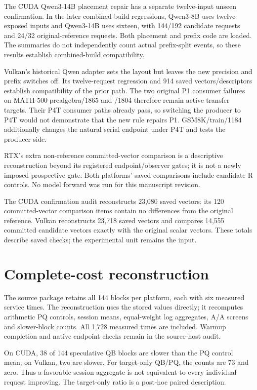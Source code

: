 The CUDA Qwen3-14B placement repair has a separate twelve-input unseen confirmation. In the later combined-build regressions, Qwen3-8B uses twelve exposed inputs and Qwen3-14B uses sixteen, with 144/192 candidate requests and 24/32 original-reference requests. Both placement and prefix code are loaded. The summaries do not independently count actual prefix-split events, so these results establish combined-build compatibility.

Vulkan's historical Qwen adapter sets the layout but leaves the new precision and prefix switches off. Its twelve-request regression and 914 saved vectors/descriptors establish compatibility of the prior path. The two original P1 consumer failures on MATH-500 prealgebra/1865 and /1804 therefore remain active transfer targets. Their P4T consumer paths already pass, so switching the producer to P4T would not demonstrate that the new rule repairs P1. GSM8K/train/1184 additionally changes the natural serial endpoint under P4T and tests the producer side.

RTX's extra non-reference committed-vector comparison is a descriptive reconstruction beyond its registered endpoint/observer gates; it is not a newly imposed prospective gate. Both platforms' saved comparisons include candidate-R controls. No model forward was run for this manuscript revision.

The CUDA confirmation audit reconstructs 23,080 saved vectors; its 120 committed-vector comparison items contain no differences from the original reference. Vulkan reconstructs 23,718 saved vectors and compares 14,555 committed candidate vectors exactly with the original scalar vectors. These totals describe saved checks; the experimental unit remains the input.

\section{Complete-cost reconstruction}
\label{app:cost}
The source package retains all 144 blocks per platform, each with six measured service times. The reconstruction uses the stored values directly; it recomputes arithmetic PQ controls, session means, equal-weight log aggregates, A/A screens and slower-block counts. All 1,728 measured times are included. Warmup completion and native endpoint checks remain in the source-host audit.

On CUDA, 38 of 144 speculative QB blocks are slower than the PQ control mean; on Vulkan, two are slower. For target-only QB/PQ, the counts are 73 and zero. Thus a favorable session aggregate is not equivalent to every individual request improving. The target-only ratio is a post-hoc paired description.


